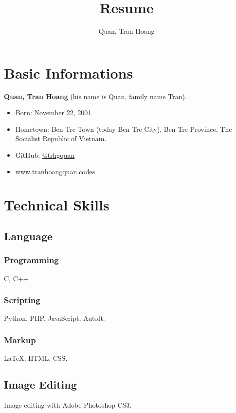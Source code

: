 \documentclass{article}
\renewcommand{\maketitle}{
    \begin{center}
        {\huge\bfseries\theauthor}
    \end{center}
}
\begin{document}
    \title{Resume}
    \author{Quan, Tran Hoang}
    \maketitle

    \section{Basic Informations}
        {\bfseries Quan, Tran Hoang} (his name is Quan, family name Tran).
        \begin{itemize}
            \item Born: November 22, 2001
            \item Hometown: Ben Tre Town (today Ben Tre City), Ben Tre Province, The Socialist Republic of Vietnam.
            \item GitHub: \href{https://github.com/trhgquan}{@trhgquan}
            \item \href{https://www.tranhoangquan.codes}{www.tranhoangquan.codes}
        \end{itemize}

    \section{Technical Skills}
        \subsection{Language}
            \subsubsection{Programming}
                C, C++
            \subsubsection{Scripting}
                Python, PHP, JavaScript, AutoIt.
            \subsubsection{Markup}
                \LaTeX, HTML, CSS.

        \subsection{Image Editing}
            Image editing with Adobe Photoshop CS3.
\end{document}
